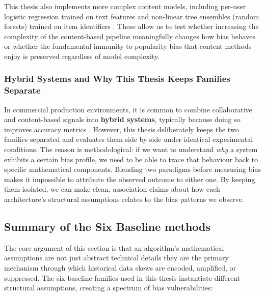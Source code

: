 \documentclass[11pt,a4paper]{report}
\begin{document}
This thesis also implements more complex content models, including per-user logistic regression trained on text features and non-linear tree ensembles (random forests) trained on item identifiers \citep{breiman2001random, pedregosa2011scikit}. These allow us to test whether increasing the complexity of the content-based pipeline meaningfully changes how bias behaves or whether the fundamental immunity to popularity bias that content methods enjoy is preserved regardless of model complexity.

\subsubsection*{Hybrid Systems and Why This Thesis Keeps Families Separate}

In commercial production environments, it is common to combine collaborative and content-based signals into \textbf{hybrid systems}, typically because doing so improves accuracy metrics \citep{adomavicius2005toward}. However, this thesis deliberately keeps the two families separated and evaluates them side by side under identical experimental conditions. The reason is methodological: if we want to understand \emph{why} a system exhibits a certain bias profile, we need to be able to trace that behaviour back to specific mathematical components. Blending two paradigms before measuring bias makes it impossible to attribute the observed outcome to either one. By keeping them isolated, we can make clean, association claims about how each architecture's structural assumptions relates to the bias patterns we observe.

\subsection{Summary of the Six Baseline methods}

The core argument of this section is that an algorithm's mathematical assumptions are not just abstract technical details they are the primary mechanism through which historical data skews are encoded, amplified, or suppressed. The six baseline families used in this thesis instantiate different structural assumptions, creating a spectrum of bias vulnerabilities:
\end{document}
